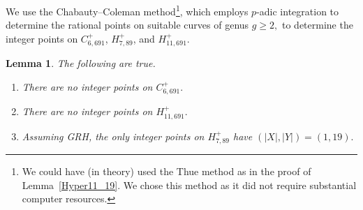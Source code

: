 \documentclass[12pt]{amsart}
\newtheorem{lem}{Lemma}[section]
\newcommand{\?}{\color{red}?}
\numberwithin{equation}{section}
\begin{document}
We use the Chabauty--Coleman method\footnote{We could have (in theory) used the Thue method as in the proof of Lemma~\ref{Hyper11_19}. We chose this method as it did not require substantial computer resources.}, which employs $p$-adic integration to determine the rational points on suitable curves of genus $g\geq 2,$  to determine  the integer points on  $C_{6,691}^{+}$, $H_{7,89}^{+}$, and
$H_{11,691}^{+}.$


\begin{lem}\label{Plus691} The following are true.
\begin{enumerate}
\item There are no integer points on $C^{+}_{6,691}.$
\item There are no integer points on  $H^{+}_{11,691}.$
\item Assuming GRH, the only integer points on $H^{+}_{7,89}$ have $(|X|,|Y|)=(1,19).$
\end{enumerate}
\end{lem}
\end{document}
